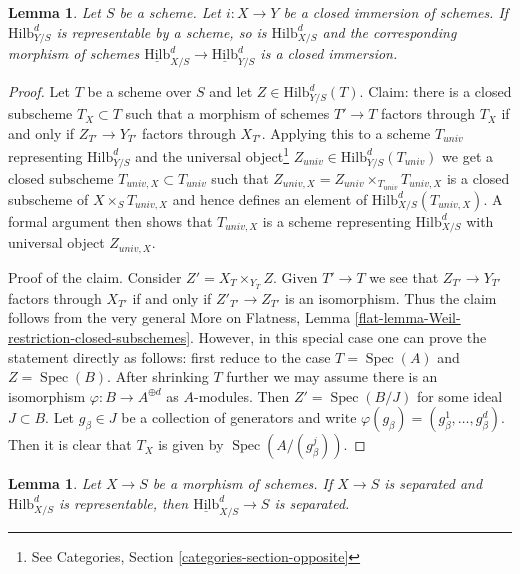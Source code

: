 \documentclass{stacks-project}
\theoremstyle{plain}
\newtheorem{lemma}[subsection]{Lemma}
\theoremstyle{definition}
\theoremstyle{remark}
\numberwithin{equation}{subsection}
\def\Spec{\mathop{\mathrm{Spec}}}
\def\Hilbfunctor{\mathrm{Hilb}}
\begin{document}
\begin{lemma}
\label{lemma-hilb-d-of-closed}
Let $S$ be a scheme. Let $i : X \to Y$ be a closed immersion of schemes.
If $\Hilbfunctor^d_{Y/S}$ is representable by a scheme, so is
$\Hilbfunctor^d_{X/S}$ and the corresponding morphism of schemes
$\underline{\Hilbfunctor}^d_{X/S} \to \underline{\Hilbfunctor}^d_{Y/S}$
is a closed immersion.
\end{lemma}

\begin{proof}
Let $T$ be a scheme over $S$ and let $Z \in \Hilbfunctor^d_{Y/S}(T)$.
Claim: there is a closed subscheme $T_X \subset T$ such
that a morphism of schemes $T' \to T$ factors through $T_X$ if
and only if $Z_{T'} \to Y_{T'}$ factors through $X_{T'}$.
Applying this to a scheme $T_{univ}$ representing $\Hilbfunctor^d_{Y/S}$ and the
universal object\footnote{See
Categories, Section \ref{categories-section-opposite}}
$Z_{univ} \in \Hilbfunctor^d_{Y/S}(T_{univ})$
we get a closed subscheme $T_{univ, X} \subset T_{univ}$ such that
$Z_{univ, X} = Z_{univ} \times_{T_{univ}} T_{univ, X}$
is a closed subscheme of $X \times_S T_{univ, X}$ and hence
defines an element of $\Hilbfunctor^d_{X/S}(T_{univ, X})$.
A formal argument then shows that $T_{univ, X}$ is a scheme
representing $\Hilbfunctor^d_{X/S}$ with universal object $Z_{univ, X}$.

\medskip\noindent
Proof of the claim. Consider $Z' = X_T \times_{Y_T} Z$. Given $T' \to T$
we see that $Z_{T'} \to Y_{T'}$ factors through $X_{T'}$ if and
only if $Z'_{T'} \to Z_{T'}$ is an isomorphism. Thus the claim follows
from the very general
More on Flatness, Lemma \ref{flat-lemma-Weil-restriction-closed-subschemes}.
However, in this special case one can prove the statement directly as
follows: first reduce to the case $T = \Spec(A)$ and $Z = \Spec(B)$.
After shrinking $T$ further we may assume there is an isomorphism
$\varphi : B \to A^{\oplus d}$ as $A$-modules. Then $Z' = \Spec(B/J)$
for some ideal $J \subset B$. Let $g_\beta \in J$ be a collection of
generators and write $\varphi(g_\beta) = (g_\beta^1, \ldots, g_\beta^d)$.
Then it is clear that $T_X$ is given by $\Spec(A/(g_\beta^j))$.
\end{proof}

\begin{lemma}
\label{lemma-hilb-d-separated}
Let $X \to S$ be a morphism of schemes. If $X \to S$ is separated and
$\Hilbfunctor^d_{X/S}$ is representable,
then $\underline{\Hilbfunctor}^d_{X/S} \to S$ is separated.
\end{lemma}
\end{document}
